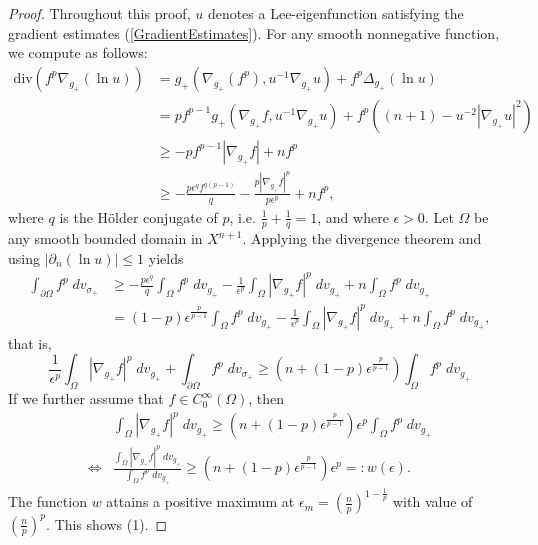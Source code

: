 \documentclass{amsart}
\newcommand{\Div}{\text{div}}
\begin{document}
\begin{proof}
Throughout this proof, $u$ denotes a Lee-eigenfunction satisfying the gradient estimates (\ref{GradientEstimates}). For any smooth nonnegative function, we compute as follows:
    \[
    \begin{split}
        \Div(f^p \nabla_{g_+} (\ln u)) &= g_+(\nabla_{g_+}(f^p), u^{-1}\nabla_{g_+}u) + f^{p}\Delta_{g_+}(\ln u) \\&= p f^{p - 1}g_+(\nabla_{g_+}f, u^{-1}\nabla_{g_+}u) + f^p((n+1) - u^{-2}|\nabla_{g_+}u|^2)\\ &\ge -pf^{p -1}|\nabla_{g_+}f| + nf^p \\&\ge -\frac{p\epsilon^qf^{q(p - 1)}}{q} - \frac{p|\nabla_{g_+}f|^p}{p\epsilon^p} + nf^p,
    \end{split}
    \]
    where $q$ is the H\"older conjugate of $p$, i.e. $\frac{1}{p}+\frac{1}{q} = 1$, and where $\epsilon>0$. Let $\Omega$ be any smooth bounded domain in $X^{n+1}$. Applying the divergence theorem and using $|\partial_n(\ln u)|\le 1$ yields
    \[
    \begin{split}
        \int_{\partial \Omega} f^p \;dv_{\sigma_+}&\ge -\frac{p\epsilon^q}{q}\int_\Omega f^{p}\;dv_{g_+} - \frac{1}{\epsilon^p}\int_\Omega |\nabla_{g_+}f|^p\;dv_{g_+} + n\int_\Omega f^p\;dv_{g_+} \\ &= (1-p)\epsilon^{\frac{p}{p-1}}\int_\Omega f^p\;dv_{g_+} -\frac{1}{\epsilon^p}\int_\Omega |\nabla_{g_+}f|^p\;dv_{g_+} + n\int_\Omega f^p\;dv_{g_+},
    \end{split}
    \]
    that is,
    \[
        \frac{1}{\epsilon^p}\int_\Omega |\nabla_{g_+}f|^p\;dv_{g_+} + \int_{\partial \Omega} f^p\;dv_{\sigma_+} \ge \left(n + (1-p)\epsilon^{\frac{p}{p-1}}\right)\int_\Omega f^p\;dv_{g_+}
    \]
    If we further assume that $f\in C^{\infty}_0(\Omega)$, then
    \[
    \begin{split}
      &\int_\Omega |\nabla_{g_+}f|^p\;dv_{g_+} \ge \left(n + (1-p)\epsilon^{\frac{p}{p-1}}\right)\epsilon^p\int_\Omega f^p\;dv_{g_+}\\ \iff& \frac{\displaystyle\int_\Omega |\nabla_{g_+}f|^p\;dv_{g_+}}{\displaystyle\int_\Omega f^p\;dv_{g_+}} \ge \left(n + (1-p)\epsilon^{\frac{p}{p-1}}\right)\epsilon^p =: w(\epsilon).
    \end{split}
    \]
    The function $w$ attains a positive maximum at $\epsilon_m = \left(\frac{n}{p}\right)^{1- \frac{1}{p}}$ with value of $\left(\frac{n}{p}\right)^p$. This shows (1).


\end{proof}
\end{document}
